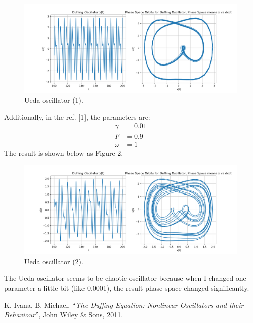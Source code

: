 \documentclass[a4paper,11pt]{article}
\begin{document}
\begin{figure}[H]
	\centering
	\includegraphics[width=15cm]{2.png}
	\caption{Ueda oscillator (1).} 
\end{figure}

Additionally, in the ref. [1], the parameters are:
\begin{align*}
    \gamma &= 0.01 \\
    F &= 0.9 \\
    \omega &= 1
\end{align*}
The result is shown below as Figure 2.

\begin{figure}[H]
	\centering
	\includegraphics[width=15cm]{3.png}
	\caption{Ueda oscillator (2).} 
\end{figure}

The Ueda oscillator seems to be chaotic oscillator because when I changed one parameter a little bit (like 0.0001), the result phase space changed significantly.

\begin{thebibliography}{99}
    K. Ivana, B. Michael, ``\textit{The Duffing Equation: Nonlinear Oscillators and their Behaviour}'', John Wiley & Sons, 2011.
\end{thebibliography}


%
\end{document}
